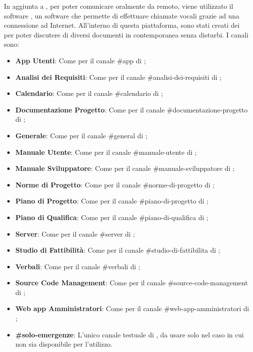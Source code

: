 In aggiunta a , per poter comunicare oralmente da remoto, viene utilizzato il software , un software che permette di effettuare chiamate vocali grazie ad una connessione ad Internet.
All'interno di questa piattaforma, sono stati creati dei  per poter discutere di diversi documenti in contemporanea senza disturbi.
I canali sono:
\begin{itemize}
	\item \textbf{App Utenti}: Come per il canale \#app di ;
	\item \textbf{Analisi dei Requisiti}: Come per il canale \#analisi-dei-requisiti di ;
	\item \textbf{Calendario}: Come per il canale \#calendario di ;
	\item \textbf{Documentazione Progetto}: Come per il canale \#documentazione-progetto di ;
	\item \textbf{Generale}: Come per il canale \#general di ;
	\item \textbf{Manuale Utente}: Come per il canale \#manuale-utente di ;
	\item \textbf{Manuale Sviluppatore}: Come per il canale \#manuale-sviluppatore di ;
	\item \textbf{Norme di Progetto}: Come per il canale \#norme-di-progetto di ;
    \item \textbf{Piano di Progetto}: Come per il canale \#piano-di-progetto di ;
	\item \textbf{Piano di Qualifica}: Come per il canale \#piano-di-qualifica di ;
	\item \textbf{Server}: Come per il canale \#server di ;
	\item \textbf{Studio di Fattibilità}: Come per il canale \#studio-di-fattibilita di ;
	\item \textbf{Verbali}: Come per il canale \#verbali di ;
	\item \textbf{Source Code Management}: Come per il canale \#source-code-management di ;
	\item \textbf{Web app Amministratori}: Come per il canale \#web-app-amministratori di ;
	\item \textbf{\#solo-emergenze}: L'unico canale testuale di , da usare solo nel caso in cui  non sia disponibile per l'utilizzo.
\end{itemize}

